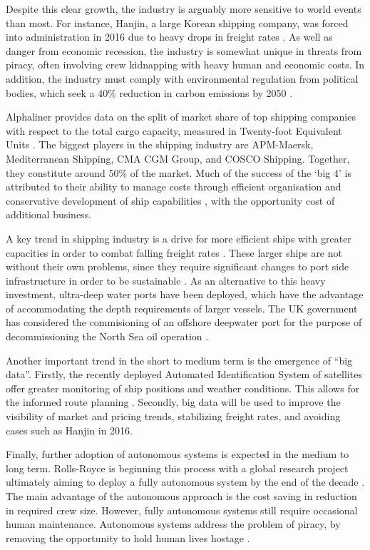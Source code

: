 Despite this clear growth, the industry is arguably more sensitive to world events than most. For instance, Hanjin, a large Korean shipping company, was forced into administration in 2016 due to heavy drops in freight rates \cite{globalCrisis}. As well as danger from economic recession, the industry is somewhat unique in threats from piracy, often involving crew kidnapping with heavy human and economic costs. In addition, the industry must comply with environmental regulation from political bodies, which seek a 40\% reduction in carbon emissions by 2050 \cite{EUReduceEmission}.

Alphaliner provides data on the split of market share of top shipping companies with respect to the total cargo capacity, measured in Twenty-foot Equivalent Units \cite{LargestShipping}. The biggest players in the shipping industry are APM-Maersk, Mediterranean Shipping, CMA CGM Group, and COSCO Shipping. Together, they constitute  around 50\% of the market. Much of the success of the `big 4' is attributed to their ability to manage costs through efficient organisation and conservative development of ship capabilities \cite{MaerskMoney}, with the opportunity cost of additional business.

A key trend in shipping industry is a drive for more efficient ships with greater capacities in order to combat falling freight rates \cite{sizematters}. These larger ships are not without their own problems, since they require significant changes to port side infrastructure  in order to be sustainable \cite{ftarticle}. As an alternative to this heavy investment, ultra-deep water ports have been deployed, which have the advantage of accommodating the depth requirements of larger vessels. The UK government has considered the commisioning of an offshore deepwater port for the purpose of decommissioning the North Sea oil operation \cite{ConservativeManifesto}.

Another important trend in the short to medium term is the emergence of ``big data”. Firstly, the recently deployed Automated Identification System of satellites offer greater monitoring of ship positions and weather conditions. This allows for the informed route planning \cite{5trends}. Secondly, big data will be used to improve the visibility of market and pricing trends, stabilizing freight rates, and avoiding cases such as Hanjin in 2016. 

Finally, further adoption of autonomous systems is expected in the medium to long term. Rolls-Royce is beginning this process with a global research project ultimately aiming to deploy a fully autonomous system by the end of the decade \cite{autoboats}. The main advantage of the autonomous approach is the cost saving in reduction in required crew size. However, fully autonomous systems still require occasional human maintenance. Autonomous systems address the problem of piracy, by removing the opportunity to hold human lives hostage \cite{SOS}.



